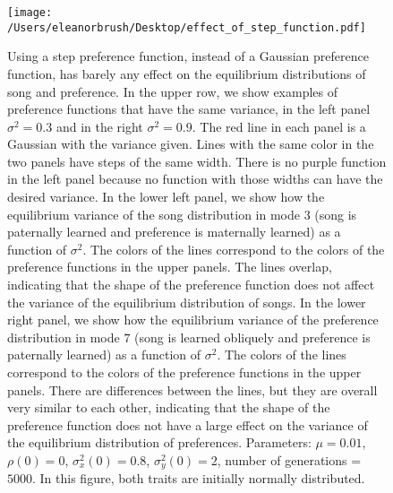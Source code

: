 \documentclass{article}
\begin{document}
\begin{figure}
\texttt{[image: /Users/eleanorbrush/Desktop/effect\_of\_step\_function.pdf]}
\caption{\label{effect_of_step_function} Using a step preference function, instead of a Gaussian preference function, has barely any effect on the equilibrium distributions of song and preference. In the upper row, we show examples of preference functions that have the same variance, in the left panel $\sigma^2=0.3$ and in the right $\sigma^2=0.9$. The red line in each panel is a Gaussian with the variance given. Lines with the same color in the two panels have steps of the same width. There is no purple function in the left panel because no function with those widths can have the desired variance. In the lower left panel, we show how the equilibrium variance of the song distribution in mode $3$ (song is paternally learned and preference is maternally learned) as a function of $\sigma^2$. The colors of the lines correspond to the colors of the preference functions in the upper panels. The lines overlap, indicating that the shape of the preference function does not affect the variance of the equilibrium distribution of songs. In the lower right panel, we show how the equilibrium variance of the preference distribution in mode $7$ (song is learned obliquely and preference is paternally learned) as a function of $\sigma^2$. The colors of the lines correspond to the colors of the preference functions in the upper panels. There are differences between the lines, but they are overall very similar to each other, indicating that the shape of the preference function does not have a large effect on the variance of the equilibrium distribution of preferences. Parameters: $\mu=0.01$, $\rho(0)=0$, $\sigma_x^2(0)=0.8$, $\sigma_y^2(0)=2$, number of generations = $5000$. In this figure, both traits are initially normally distributed.}
\end{figure}
\end{document}
